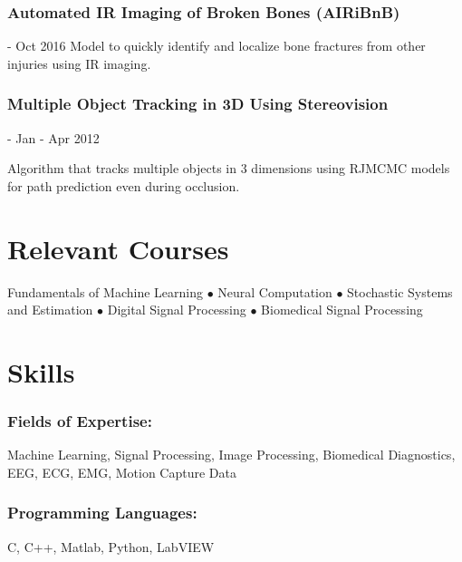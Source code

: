 \documentclass{article}
\begin{document}
 \subsubsection{Automated IR Imaging of Broken Bones (AIRiBnB)} - Oct 2016
\noindent 
Model to quickly identify and localize bone fractures from other injuries using IR imaging.
    
\subsubsection{Multiple Object Tracking in 3D Using Stereovision} - Jan - Apr 2012

Algorithm that tracks multiple objects in 3 dimensions using RJMCMC models for path prediction even during occlusion.
    


\section{Relevant Courses}
Fundamentals of Machine Learning $\bullet$ Neural Computation $\bullet$ Stochastic Systems and Estimation $\bullet$ Digital Signal Processing $\bullet$ Biomedical Signal Processing 

\section{Skills}
\subsubsection{Fields of Expertise:} 
Machine Learning, Signal Processing, Image Processing, Biomedical Diagnostics, EEG, ECG, EMG, Motion Capture Data
\subsubsection{Programming Languages:} 
C, C++, Matlab, Python, LabVIEW
\end{document}
